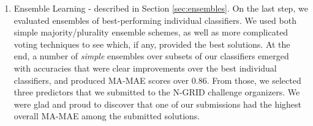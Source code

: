 \begin{enumerate}
 \item \textsf{Ensemble Learning} - described in Section \ref{sec:ensembles}. On the
 last step, we evaluated ensembles of best-performing individual classifiers. 
 We used both simple majority/plurality ensemble schemes, as well as more complicated voting
techniques to see which, if any, provided the best solutions.
At the end, a number of \textit{simple} ensembles over subsets of our classifiers emerged with accuracies
that were clear improvements over the best  individual classifiers, and produced \textsf{MA-MAE} scores over 0.86.  From those, we selected three predictors that we submitted
to the N-GRID  challenge organizers.  
We were glad and proud to discover that one of our submissions had the
highest overall \textsf{MA-MAE} among the submitted solutions.
\end{enumerate}

